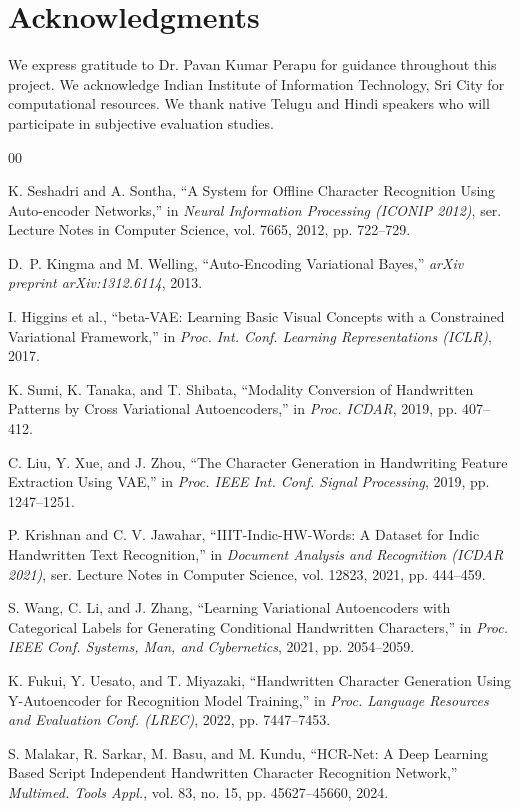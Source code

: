 \documentclass[review]{elsarticle}
\begin{document}
\section*{Acknowledgments}

We express gratitude to Dr. Pavan Kumar Perapu for guidance throughout this project. We acknowledge Indian Institute of Information Technology, Sri City for computational resources. We thank native Telugu and Hindi speakers who will participate in subjective evaluation studies.

\begin{thebibliography}{00}

K. Seshadri and A. Sontha,
``A System for Offline Character Recognition Using Auto-encoder Networks,''
in \textit{Neural Information Processing (ICONIP 2012)}, ser. Lecture Notes in Computer Science, vol. 7665, 2012, pp. 722--729.

D.~P. Kingma and M. Welling,
``Auto-Encoding Variational Bayes,''
\textit{arXiv preprint arXiv:1312.6114}, 2013.

I. Higgins et al.,
``beta-VAE: Learning Basic Visual Concepts with a Constrained Variational Framework,''
in \textit{Proc. Int. Conf. Learning Representations (ICLR)}, 2017.

K. Sumi, K. Tanaka, and T. Shibata,
``Modality Conversion of Handwritten Patterns by Cross Variational Autoencoders,''
in \textit{Proc. ICDAR}, 2019, pp. 407--412.

C. Liu, Y. Xue, and J. Zhou,
``The Character Generation in Handwriting Feature Extraction Using VAE,''
in \textit{Proc. IEEE Int. Conf. Signal Processing}, 2019, pp. 1247--1251.

P. Krishnan and C. V. Jawahar,
``IIIT-Indic-HW-Words: A Dataset for Indic Handwritten Text Recognition,''
in \textit{Document Analysis and Recognition (ICDAR 2021)}, ser. Lecture Notes in Computer Science, vol. 12823, 2021, pp. 444--459.

S. Wang, C. Li, and J. Zhang,
``Learning Variational Autoencoders with Categorical Labels for Generating Conditional Handwritten Characters,''
in \textit{Proc. IEEE Conf. Systems, Man, and Cybernetics}, 2021, pp. 2054--2059.

K. Fukui, Y. Uesato, and T. Miyazaki,
``Handwritten Character Generation Using Y-Autoencoder for Recognition Model Training,''
in \textit{Proc. Language Resources and Evaluation Conf. (LREC)}, 2022, pp. 7447--7453.

S. Malakar, R. Sarkar, M. Basu, and M. Kundu,
``HCR-Net: A Deep Learning Based Script Independent Handwritten Character Recognition Network,''
\textit{Multimed. Tools Appl.}, vol. 83, no. 15, pp. 45627--45660, 2024.

\end{thebibliography}
\end{document}
